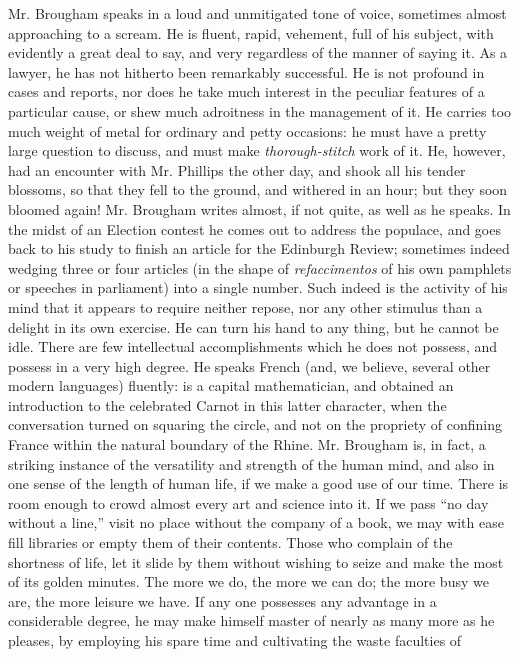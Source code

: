 Mr. Brougham speaks in a loud and unmitigated tone of voice,
sometimes almost approaching to a scream. He is fluent, rapid,
vehement, full of his subject, with evidently a great deal to say,
and very regardless of the manner of saying it. As a lawyer, he
has not hitherto been remarkably successful. He is not profound in
cases and reports, nor does he take much interest in the peculiar
features of a particular cause, or shew much adroitness in the
management of it. He carries too much weight of metal for ordinary
and petty occasions: he must have a pretty large question to
discuss, and must make \emph{thorough-stitch} work of it. He,
however, had an encounter with Mr. Phillips the other day, and
shook all his tender blossoms, so that they fell to the ground,
and withered in an hour; but they soon bloomed again! Mr. Brougham
writes almost, if not quite, as well as he speaks. In the midst of
an Election contest he comes out to address the populace, and goes
back to his study to finish an article for the Edinburgh Review;
sometimes indeed wedging three or four articles (in the shape of
\emph{refaccimentos} of his own pamphlets or speeches in
parliament) into a single number. Such indeed is the activity of
his mind that it appears to require neither repose, nor any other
stimulus than a delight in its own exercise. He can turn his hand
to any thing, but he cannot be idle. There are few intellectual
accomplishments which he does not possess, and possess in a very
high degree. He speaks French (and, we believe, several other
modern languages) fluently: is a capital mathematician, and
obtained an introduction to the celebrated Carnot in this latter
character, when the conversation turned on squaring the circle,
and not on the propriety of confining France within the natural
boundary of the Rhine. Mr. Brougham is, in fact, a striking
instance of the versatility and strength of the human mind, and
also in one sense of the length of human life, if we make a good
use of our time. There is room enough to crowd almost every art
and science into it. If we pass ``no day without a line,'' visit
no place without the company of a book, we may with ease fill
libraries or empty them of their contents. Those who complain of
the shortness of life, let it slide by them without wishing to
seize and make the most of its golden minutes. The more we do, the
more we can do; the more busy we are, the more leisure we have. If
any one possesses any advantage in a considerable degree, he may
make himself master of nearly as many more as he pleases, by
employing his spare time and cultivating the waste faculties of
